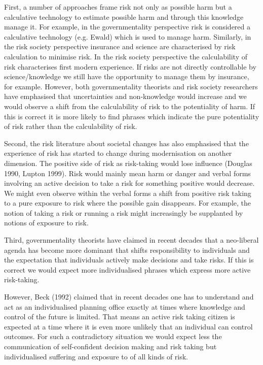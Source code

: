 First, a number of approaches frame risk not only as possible harm but a calculative technology to estimate possible harm and through this knowledge manage it. For example, in the governmentality perspective risk is considered a calculative technology (e.g. Ewald) which is used to manage harm. Similarly, in the risk society perspective insurance and science are characterised by risk calculation to minimise risk. In the risk society perspective the calculability of risk characterises first modern experience. If risks are not directly controllable by science/knowledge we still have the opportunity to manage them by insurance, for example. However, both governmentality theorists and risk society researchers have emphasised that uncertainties and non-knowledge would increase and we would observe a shift from the calculability of risk to the potentiality of harm. If this is correct it is more likely to find phrases which indicate the pure potentiality of risk rather than the calculability of risk.

Second, the risk literature about societal changes has also emphasised that the experience of risk has started to change during modernisation on another dimension. The positive side of risk as risk-taking would lose influence (Douglas 1990, Lupton 1999). Risk would mainly mean harm or danger and verbal forms involving an active decision to take a risk for something positive would decrease. We might even observe within the verbal forms a shift from positive risk taking to a pure exposure to risk where the possible gain disappears. For example, the notion of taking a risk or running a risk might increasingly be supplanted by notions of exposure to risk.

Third, governmentality theorists have claimed in recent decades that a neo-liberal agenda has become more dominant that shifts responsibility to individuals and the expectation that individuals actively make decisions and take risks. If this is correct we would expect more individualised phrases which express more active risk-taking.

However, Beck (1992) claimed that in recent decades one has to understand and act as an individualised planning office exactly at times where knowledge and control of the future is limited. That means an active risk taking citizen is expected at a time where it is even more unlikely that an individual can control outcomes. For such a contradictory situation we would expect less the communication of self-confident decision making and risk taking but individualised suffering and exposure to of all kinds of risk.

